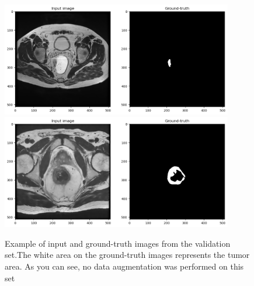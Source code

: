 \documentclass{standalone}
\begin{document}
\begin{figure}[htp]

    \centering
    \includegraphics[width=0.9\textwidth]{../images/showdataset2.png}
    \includegraphics[width=0.9\textwidth]{../images/showdataset3.png}

    \caption{Example of input and ground-truth images from the validation set.The white area on the ground-truth images represents the tumor area. As you can see, no data augmentation was performed on this set}
    \label{showdataset2}
    
    \end{figure}
\end{document}
